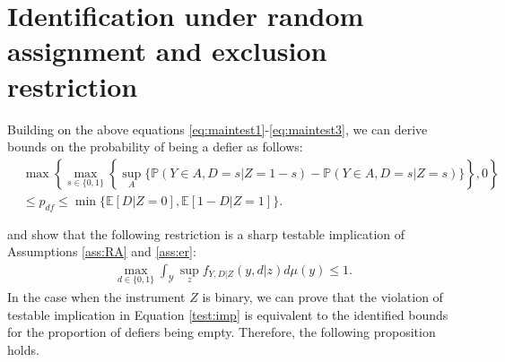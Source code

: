 \documentclass[12pt]{article}
\theoremstyle{plain}
\theoremstyle{definition}
\theoremstyle{remark}
\begin{document}
\section{Identification under random assignment and exclusion restriction} \label{sec:ra_er:ass}
Building on the above equations \eqref{eq:maintest1}-\eqref{eq:maintest3}, we can derive bounds on the probability of being a defier as follows: 
\begin{align*}
& \max \left\{\max _{s \in\{0,1\}}\left\{\sup _A\{\mathbb{P}(Y \in A, D=s  \vert  Z=1-s)-\mathbb{P}(Y \in A, D=s  \vert  Z=s)\}\right\}, 0\right\} \\
& \leq p_{d f} \leq \min \{\mathbb{E}[D  \vert  Z=0], \mathbb{E}[1-D  \vert  Z=1]\} .
\end{align*}

\cite{Kedagni2020GeneralizedAssumption} and \cite{Kitagawa2021TheIndependence} show that the following restriction is a sharp testable implication of Assumptions \ref{ass:RA} and \ref{ass:er}:
\begin{eqnarray}\label{test:imp}
    \max_{d\in\{0,1\}} \int_{\mathcal Y} \sup_{z}f_{Y,D \vert Z}(y,d\vert z) d \mu(y) \leq 1.
\end{eqnarray}
In the case when the instrument $Z$ is binary, we can prove that the violation of testable implication in Equation \eqref{test:imp} is equivalent to the identified bounds for the proportion of defiers being empty. Therefore, the following proposition holds.
\end{document}
